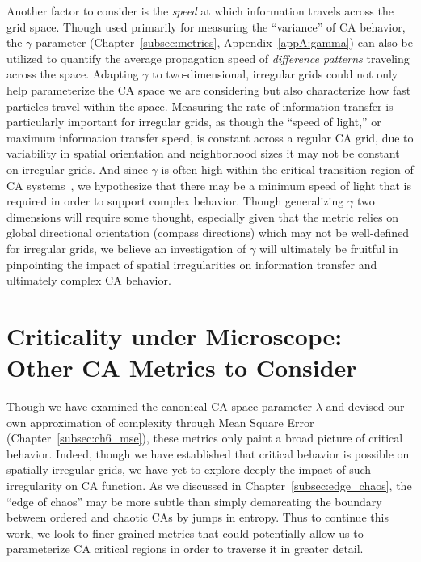 \documentclass[a4paper,11pt,twoside]{report}
\begin{document}
Another factor to consider is the \textit{speed} at which information travels across the grid space. Though used primarily for measuring the ``variance'' of CA behavior, the $\gamma$ parameter (Chapter~\ref{subsec:metrics}, Appendix~\ref{appA:gamma}) can also be utilized to quantify the average propagation speed of \textit{difference patterns} traveling across the space. Adapting $\gamma$ to two-dimensional, irregular grids could not only help parameterize the CA space we are considering but also characterize how fast particles travel within the space. Measuring the rate of information transfer is particularly important for irregular grids, as though the ``speed of light,'' or maximum information transfer speed, is constant across a regular CA grid, due to variability in spatial orientation and neighborhood sizes it may not be constant on irregular grids. And since $\gamma$ is often high within the critical transition region of CA systems~\cite{mi93}, we hypothesize that there may be a minimum speed of light that is required in order to support complex behavior. Though generalizing $\gamma$ two dimensions will require some thought, especially given that the metric relies on global directional orientation (compass directions) which may not be well-defined for irregular grids, we believe an investigation of $\gamma$ will ultimately be fruitful in pinpointing the impact of spatial irregularities on information transfer and ultimately complex CA behavior.

\section{Criticality under Microscope: Other CA Metrics to Consider}

Though we have examined the canonical CA space parameter $\lambda$ and devised our own approximation of complexity through Mean Square Error (Chapter~\ref{subsec:ch6_mse}), these metrics only paint a broad picture of critical behavior. Indeed, though we have established that critical behavior is possible on spatially irregular grids, we have yet to explore deeply the impact of such irregularity on CA function. As we discussed in Chapter~\ref{subsec:edge_chaos}, the ``edge of chaos'' may be more subtle than simply demarcating the boundary between ordered and chaotic CAs by jumps in entropy. Thus to continue this work, we look to finer-grained metrics that could potentially allow us to parameterize CA critical regions in order to traverse it in greater detail.
\end{document}
